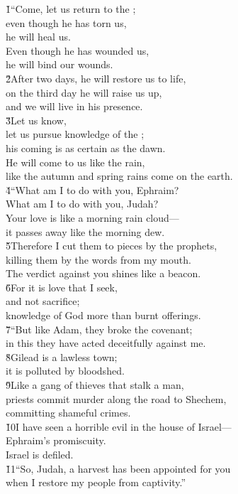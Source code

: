 \begin{poetry}
\poeml {}
\v{1}``Come, let us return to the ; \\
\poemll    even though he has torn us, \\
\poemlll       he will heal us. \\
\poeml Even though he has wounded us, \\
\poemll    he will bind our wounds. \\
\poeml \v{2}After two days, he will restore us to life, \\
\poemll    on the third day he will raise us up, \\
\poemlll       and we will live in his presence. \\
\poeml \v{3}Let us know, \\
\poemll    let us pursue knowledge of the ; \\
\poemlll       his coming is as certain as the dawn. \\
\poeml He will come to us like the rain, \\
\poemll    like the autumn and spring rains come on the earth. \\
\poeml \v{4}``What am I to do with you, Ephraim? \\
\poemll    What am I to do with you, Judah? \\
\poeml Your love is like a morning rain cloud--- \\
\poemll    it passes away like the morning dew. \\
\poeml \v{5}Therefore I cut them to pieces by the prophets, \\
\poemll    killing them by the words from my mouth. \\
\poemlll       The verdict against you shines like a beacon. \\
\poeml \v{6}For it is love that I seek, \\
\poemll    and not sacrifice; \\
\poemlll       knowledge of God more than burnt offerings. \\
\poeml \v{7}``But like Adam, they broke the covenant; \\
\poemll    in this they have acted deceitfully against me. \\
\poeml \v{8}Gilead is a lawless town; \\
\poemll    it is polluted by bloodshed. \\
\poeml \v{9}Like a gang of thieves that stalk a man, \\
\poemll    priests commit murder along the road to Shechem, \\
\poemlll       committing shameful crimes. \\
\poeml \v{10}I have seen a horrible evil in the house of Israel--- \\
\poemll    Ephraim's promiscuity. \\
\poemlll       Israel is defiled. \\
\poeml \v{11}``So, Judah, a harvest has been appointed for you \\
\poemll    when I restore my people from captivity.''
\end{poetry}
